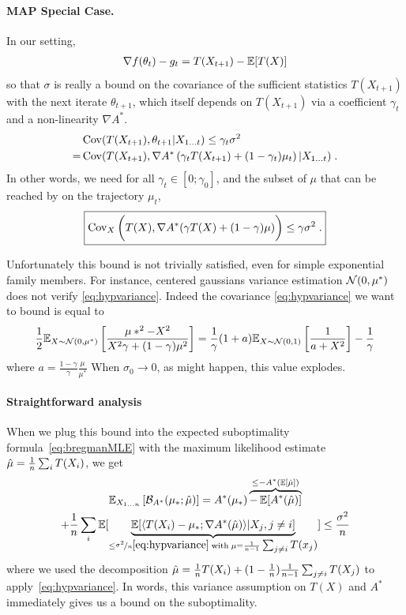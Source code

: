 \documentclass{article}
\newcommand*{\expect}[2][]{\ensuremath{\mathbb{E}_{#1} \left[ #2 \right] }} %
\newcommand{\logpart}{A}
\newcommand{\conj}{\logpart^*}
\newcommand{\bregmanconj}{\cB_{\logpart^*}}
\newcommand{\nat}{\theta}
\newcommand{\lr}{\gamma} %
\begin{document}
\paragraph{MAP Special Case.}
In our setting, 
\begin{align}
	\nabla f(\nat_t) - g_t =  T(X_{t+1})	- \E[T(X)]
\end{align}
so that $\sigma$ is really a bound on the covariance of the sufficient statistics $T(X_{t+1})$ with the next iterate $\nat_{t+1}$, which itself depends on $T(X_{t+1})$ via a coefficient $\lr_t$ and a non-linearity $\nabla\conj$.
\begin{align}
	&\Cov( T(X_{t+1}), \nat_{t+1} | X_{1\dots t})
	\leq \lr_t\sigma^2 
	\label{eq:covariance_assumption} \\
	=& \Cov(T(X_{t+1}), \nabla\conj \left(\lr_t T(X_{t+1}) + (1-\lr_t ) \mu_t \right) | X_{1\dots t}) \;.
\end{align}
In other words, we need for all $\lr_t \in [0; \lr_0]$, and the subset of $\mu$ that can be reached by on the trajectory $\mu_t$,
\begin{align}
\label{eq:hypvariance}
	\boxed{
	\Cov_X \bigg(T(X), \nabla \conj (\lr T(X) + (1-\lr) \mu)\bigg	) 
	\leq \lr \sigma^2 \; .
	}
\end{align}

\begin{example}
Unfortunately this bound is not trivially satisfied, even for simple exponential family members.
For instance, centered gaussians variance estimation ${\mathcal N}(0,\mu^*)$ does not verify \eqref{eq:hypvariance}.
Indeed the covariance  \eqref{eq:hypvariance} we want to bound is equal to
\begin{align}
	\half \expect[X\sim \cN(0,\mu^*)]{\frac{\mu*^2 - X^2 }{ X^2 \lr + (1-\lr) \mu^2 }}
	= \inv{\lr} (1+a) \expect[X \sim \cN(0,1)]{\inv{a + X^2}} - \inv{\lr} 
\end{align}
where $a = \frac{1-\lr}{\lr} \frac{\mu}{\mu^*}$
When $\sigma_0 \rightarrow 0$, as might happen, this value explodes.
\end{example}

\paragraph{Straightforward analysis}
When we plug this bound into the expected suboptimality formula~\eqref{eq:bregmanMLE} with the maximum likelihood estimate $\hat \mu =  \frac{1}{n}\sum_i T(X_i)$, we get
\begin{multline}
	\expect[X_{1\dots n}]{\bregmanconj ( \mu_* ;\hat \mu) }
	=\conj(\mu_*) \overbrace{- \E[\conj(\hat \mu)]}^{\leq - \conj(\E[\hat \mu])} \\
	+ \inv{n}\sum_i \E[\underbrace{\E[\langle  T(X_i) - \mu_*; \nabla\conj (\hat \mu) \rangle | X_j, j\neq i]}_{\leq \nicefrac{\sigma^2}{n} \eqref{eq:hypvariance}
	 	\; \text{with}\; \mu=\inv{n-1}\smallsum_{j\neq i} T(x_j)  } ]  \leq \frac{\sigma^2}{n}
\label{eq:MLE_bound}
\end{multline}
where we used the decomposition $\hat \mu = \frac{1}{n}T(X_i) + (1-\frac{1}{n}) \frac{1}{n-1} \sum_{j\neq i}T(X_j)$ to apply~\eqref{eq:hypvariance}. 
In words, this variance assumption on $T(X)$ and $\conj$ immediately gives us a bound on the suboptimality. 
\end{document}
